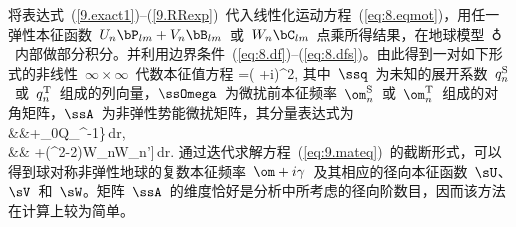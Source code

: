 将表达式~(\ref{9.exact1})--(\ref{9.RRexp})~代入线性化运动方程~(\ref{eq:8.eqmot})，用任一弹性本征函数~$U_n\bP_{lm}+V_n\bB_{lm}$~或~$W_n\bC_{lm}$~点乘所得结果，在地球模型~$\earth$~内部做部分积分。并利用边界条件~(\ref{eq:8.df})--(\ref{eq:8.dfs})。由此得到一对如下形式的非线性~$\infty\times\infty$~代数本征值方程
\hspace{0.2 mm}\ssq=(\om
+i\gamma)^2\ssq,
\label{eq:9.mateq}
\en
其中~$\ssq$~为未知的展开系数~$q_n^{\rm S}$~或~$q_n^{\rm T}$~组成的列向量，$\ssOmega$~为微扰前本征频率~$\om_n^{\rm S}$~或~$\om_n^{\rm T}$~组成的对角矩阵，$\ssA$~为非弹性势能微扰矩阵，其分量表达式为
\eqa \label{9.matel}
 \nonumber \\
&&\mbox{}+\mu_0Q_{\mu}^{-1}
\Big\}\,dr,
\ena
\eqa \label{9.matel2}
\lefteqn{A_{nn'}^{\rm T}=\int_0^a
\mu_0Q_{\mu}^{-1}
\big[(r\dW_{\!n}-W_n)(r\dW_{\!n'}-W_{n'})} \nonumber \\
&&\mbox{}\qquad\quad\hspace{4.0 mm}
+(\sqL^2-2)W_nW_{n'}\big]\,dr.
\ena
通过迭代求解方程~(\ref{eq:9.mateq})~的截断形式，可以得到球对称非弹性地球的复数本征频率~$\om
+i\gamma$~及其相应的径向本征函数~$\sU$、$\sV$~和~$\sW$。矩阵~$\ssA$~的维度恰好是分析中所考虑的径向阶数目，因而该方法在计算上较为简单。

